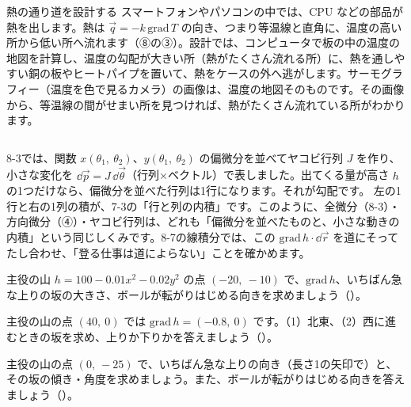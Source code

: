 \begin{column}{熱の通り道を設計する}
スマートフォンやパソコンの中では、CPU などの部品が熱を出します。熱は $\vec q=-k\,\mathrm{grad}\,T$ の向き、つまり等温線と直角に、温度の高い所から低い所へ流れます（⑧の③）。設計では、コンピュータで板の中の温度の地図を計算し、温度の勾配が大きい所（熱がたくさん流れる所）に、熱を通しやすい銅の板やヒートパイプを置いて、熱をケースの外へ逃がします。サーモグラフィー（温度を色で見るカメラ）の画像は、温度の地図そのものです。その画像から、等温線の間がせまい所を見つければ、熱がたくさん流れている所がわかります。
\end{column}

\begin{motto}[5]
8-3では、関数 $x(\theta_1,\ \theta_2)$、$y(\theta_1,\ \theta_2)$ の偏微分を並べてヤコビ行列 $J$ を作り、小さな変化を $\dd\vec p=J\,\dd\vec\theta$（行列×ベクトル）で表しました。出てくる量が高さ $h$ の1つだけなら、偏微分を並べた行列は1行になります。それが勾配です。
左の1行と右の1列の積が、7-3の「行と列の内積」です。このように、全微分（8-3）・方向微分（④）・ヤコビ行列は、どれも「偏微分を並べたものと、小さな動きの内積」という同じしくみです。8-7の線積分では、この $\mathrm{grad}\,h\cdot\dd\vec r$ を道にそってたし合わせ、「登る仕事は道によらない」ことを確かめます。
\end{motto}

\bkendproblems
{}

\bkproblem 主役の山 $h=100-0.01x^2-0.02y^2$ の点 $(-20,\ -10)$ で、$\mathrm{grad}\,h$、いちばん急な上りの坂の大きさ、ボールが転がりはじめる向きを求めましょう\mbox{（）}。

\bkproblem 主役の山の点 $(40,\ 0)$ では $\mathrm{grad}\,h=(-0.8,\ 0)$ です。（1）北東、（2）西に進むときの坂を求め、上りか下りかを答えましょう\mbox{（）}。

\bkproblem 主役の山の点 $(0,\ -25)$ で、いちばん急な上りの向き（長さ1の矢印で）と、その坂の傾き・角度を求めましょう。また、ボールが転がりはじめる向きを答えましょう\mbox{（）}。

